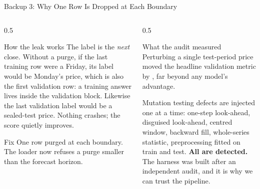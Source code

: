 \documentclass[aspectratio=169,11pt]{beamer}
\newcommand{\repourl}{https://github.com/Steven-ZYC/INT4096-ML-Financial-Forecasting}
\newcommand{\currentrepolink}{}
\newcommand{\repolink}[2]{\gdef\currentrepolink{%
  \href{\repourl/#1/main/#2}{\color{accent}GitHub: \texttt{\detokenize{#2}}}}}
\begin{document}
\begin{frame}{Backup 3: Why One Row Is Dropped at Each Boundary}
  \repolink{blob}{docs/quality/leakage_audit.md}
  \begin{columns}[T]
    \begin{column}{0.5\textwidth}
      \begin{block}{How the leak works}
        \scriptsize
        The label is the \emph{next} close. Without a purge, if the last training
        row were a Friday, its label would be Monday's price, which is also the
        first validation row: a training answer lives inside the validation
        block. Likewise the last validation label would be a sealed-test price.
        Nothing crashes; the score quietly improves.
      \end{block}
      \begin{block}{Fix}
        \scriptsize
        One row purged at each boundary. The loader now refuses a purge
        smaller than the forecast horizon.
      \end{block}
    \end{column}
    \begin{column}{0.5\textwidth}
      \begin{block}{What the audit measured}
        \scriptsize
        Perturbing a single test-period price moved the headline validation
        metric by \textbf{\LeakDelta{}}, far beyond any model's advantage.
      \end{block}
      \begin{block}{Mutation testing}
        \scriptsize
        \NMutations{} defects are injected one at a time: one-step look-ahead,
        disguised look-ahead, centred window, backward fill, whole-series
        statistic, preprocessing fitted on train and test.
        \textbf{All \NMutations{} are detected.} The harness was built after
        an independent audit, and it is why we can trust the pipeline.
      \end{block}
    \end{column}
  \end{columns}
\end{frame}
\end{document}
